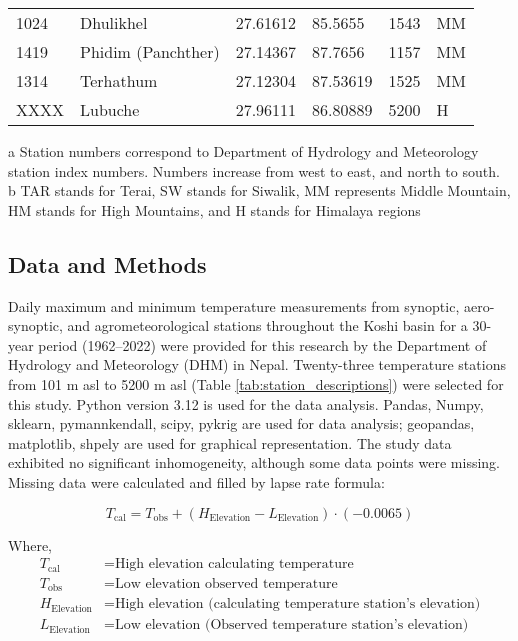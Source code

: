 \begin{table}[H]
\begin{tabularx}{\textwidth}{|X|X|X|X|X|X|}
      1024 & Dhulikhel         & 27.61612 & 85.5655  & 1543 & MM \\
      1419 & Phidim (Panchther) & 27.14367 & 87.7656  & 1157 & MM \\
      1314 & Terhathum         & 27.12304 & 87.53619 & 1525 & MM \\
      XXXX & Lubuche           & 27.96111 & 86.80889 & 5200 & H \\
      \bottomrule %
  \end{tabularx}
  \begin{flushleft}
      \footnotesize{a Station numbers correspond to Department of Hydrology and Meteorology station index numbers. Numbers increase from west to east, and north to south.} \\
      \footnotesize{b TAR stands for Terai, SW stands for Siwalik, MM represents Middle Mountain, HM stands for High Mountains, and H stands for Himalaya regions}
  \end{flushleft}
\end{table}

\subsection{Data and Methods}


Daily maximum and minimum temperature measurements from synoptic, aero-synoptic, and agrometeorological stations throughout the Koshi basin for a 30-year period (1962–2022) were provided for this research by the Department of Hydrology and Meteorology (DHM) in Nepal. Twenty-three temperature stations from 101 m asl to 5200 m asl (Table \ref{tab:station_descriptions}) were selected for this study. Python version 3.12 is used for the data analysis. Pandas, Numpy, sklearn, pymannkendall, scipy, pykrig are used for data analysis; geopandas, matplotlib, shpely are used for graphical representation. The study data exhibited no significant inhomogeneity, although some data points were missing. Missing data were calculated and filled by lapse rate formula:

\begin{equation}
  T_{\text{cal}} = T_{\text{obs}} + (H_{\text{Elevation}} - L_{\text{Elevation}}) \cdot (-0.0065)
  \label{eq:lapse_calculation}
  \end{equation}
  
  Where, 
  \begin{align*}
  T_{\text{cal}} & = \text{High elevation calculating temperature} \\
  T_{\text{obs}} & = \text{Low elevation observed temperature} \\
  H_{\text{Elevation}} & = \text{High elevation (calculating temperature station's elevation)}  \\
  L_{\text{Elevation}} & = \text{Low elevation (Observed temperature station's elevation)}   
  \end{align*}

